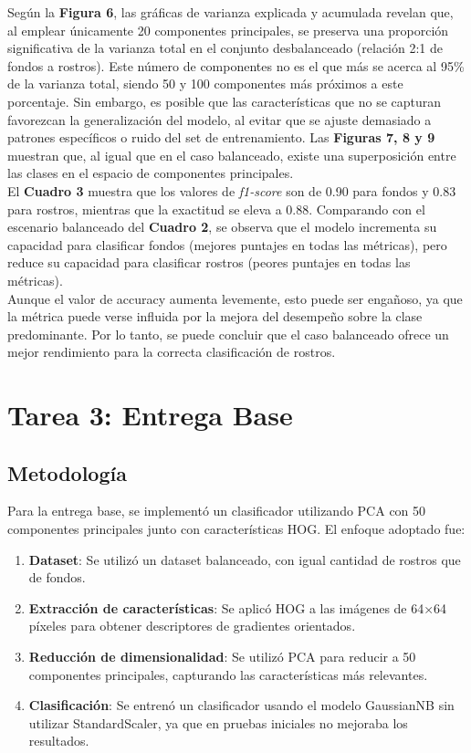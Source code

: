 \documentclass{article}
\begin{document}
Según la \textbf{Figura 6}, las gráficas de varianza explicada y acumulada revelan que, al emplear únicamente 20 componentes principales, se preserva una proporción significativa de la varianza total en el conjunto desbalanceado (relación 2:1 de fondos a rostros). Este número de componentes no es el que más se acerca al 95\% de la varianza total, siendo 50 y 100 componentes más próximos a este porcentaje. Sin embargo, es posible que las características que no se capturan favorezcan la generalización del modelo, al evitar que se ajuste demasiado a patrones específicos o ruido del set de entrenamiento. Las \textbf{Figuras 7, 8 y 9} muestran que, al igual que en el caso balanceado, existe una superposición entre las clases en el espacio de componentes principales.\\

El \textbf{Cuadro 3} muestra que los valores de \textit{f1-score} son de 0.90 para fondos y 0.83 para rostros, mientras que la exactitud se eleva a 0.88. Comparando con el escenario balanceado del \textbf{Cuadro 2}, se observa que el modelo incrementa su capacidad para clasificar fondos (mejores puntajes en todas las métricas), pero reduce su capacidad para clasificar rostros (peores puntajes en todas las métricas).\\

Aunque el valor de accuracy aumenta levemente, esto puede ser engañoso, ya que la métrica puede verse influida por la mejora del desempeño sobre la clase predominante. Por lo tanto, se puede concluir que el caso balanceado ofrece un mejor rendimiento para la correcta clasificación de rostros.

\pagebreak
\section*{Tarea 3: Entrega Base}

\subsection*{Metodología}

Para la entrega base, se implementó un clasificador utilizando PCA con 50 componentes principales junto con características HOG. El enfoque adoptado fue:

\begin{enumerate}
    \item \textbf{Dataset}: Se utilizó un dataset balanceado, con igual cantidad de rostros que de fondos.
    \item \textbf{Extracción de características}: Se aplicó HOG a las imágenes de 64×64 píxeles para obtener descriptores de gradientes orientados.
    \item \textbf{Reducción de dimensionalidad}: Se utilizó PCA para reducir a 50 componentes principales, capturando las características más relevantes.
    \item \textbf{Clasificación}: Se entrenó un clasificador usando el modelo GaussianNB sin utilizar StandardScaler, ya que en pruebas iniciales no mejoraba los resultados.
\end{enumerate}
\end{document}

